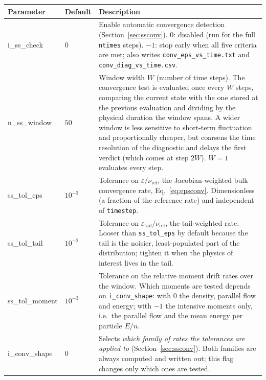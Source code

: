 \documentclass[11pt,a4paper]{article}
\begin{document}
\begin{longtable}{>{\ttfamily}p{3.2cm} p{1.5cm} p{9cm}}
\toprule
\normalfont Parameter & Default & Description \\
\midrule
\endhead
\bottomrule
\endlastfoot

i\_ss\_check & $0$ &
  Enable automatic convergence detection (Section~\ref{sec:ssconv}).
  $0$: disabled (run for the full \texttt{ntimes} steps).
  $-1$: stop early when all five criteria are met; also writes
  \texttt{conv\_eps\_vs\_time.txt} and \texttt{conv\_diag\_vs\_time.csv}. \\[4pt]

n\_ss\_window & $50$ &
  Window width $W$ (number of time steps).  The convergence test is evaluated
  once every $W$ steps, comparing the current state with the one stored at the
  previous evaluation and dividing by the physical duration the window spans.  A
  wider window is less sensitive to short-term fluctuation and proportionally
  cheaper, but coarsens the time resolution of the diagnostic and delays the
  first verdict (which comes at step $2W$).  $W = 1$ evaluates every step. \\[4pt]

ss\_tol\_eps & $10^{-3}$ &
  Tolerance on $\varepsilon/\nu_\mathrm{ref}$, the Jacobian-weighted bulk
  convergence rate, Eq.~\eqref{eq:epsconv}.  Dimensionless (a fraction of the
  reference rate) and independent of \texttt{timestep}. \\[4pt]

ss\_tol\_tail & $10^{-2}$ &
  Tolerance on $\varepsilon_\mathrm{tail}/\nu_\mathrm{ref}$, the tail-weighted
  rate.  Looser than \texttt{ss\_tol\_eps} by default because the tail is the
  noisier, least-populated part of the distribution; tighten it when the physics
  of interest lives in the tail. \\[4pt]

ss\_tol\_moment & $10^{-3}$ &
  Tolerance on the relative moment drift rates over the window.  Which moments
  are tested depends on \texttt{i\_conv\_shape}: with $0$ the density, parallel
  flow and energy; with $-1$ the intensive moments only, i.e.\ the parallel flow
  and the mean energy per particle $E/n$. \\[4pt]

i\_conv\_shape & $0$ &
  Selects \emph{which family of rates the tolerances are applied to}
  (Section~\ref{sec:ssconv}).  Both families are always computed and written out;
  this flag changes only which ones are tested.


\end{longtable}
\end{document}
